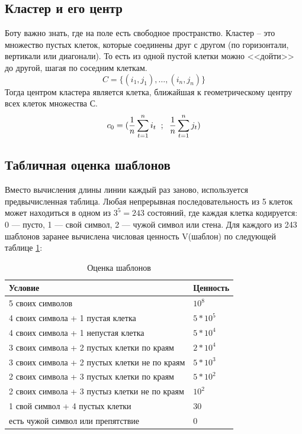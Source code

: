 \documentclass[14pt]{extreport}
\begin{document}
\subsection{Кластер и его центр}
Боту важно знать, где на поле есть свободное пространство.
Кластер -- это множество пустых клеток, которые соединены друг с другом (по горизонтали, вертикали или диагонали). То есть из одной пустой клетки можно <<дойти>> до другой, шагая по соседним клеткам.
\[ C = \{ (i_1, j_1), \dots , (i_n, j_n) \}\]
Тогда центром кластера является клетка, ближайшая к геометрическому центру всех клеток множества С.
\[ c_0 = ( \frac{1}{n} \sum_{t=1}^{n} i_t \hspace{2mm};\hspace{2mm} \frac{1}{n} \sum_{t=1}^{n} j_t) \]

\subsection{Табличная оценка шаблонов}
Вместо вычисления длины линии каждый раз заново, используется предвычисленная таблица. Любая непрерывная последовательность из 5 клеток может находиться в одном из 
$ 3^5=243 $ состояний, где каждая клетка кодируется: \\
0 — пусто,
1 — свой символ,
2 — чужой символ или стена.
Для каждого из 243 шаблонов заранее вычислена числовая ценность V(шаблон) по следующей таблице \ref{tab1}:
\begin{table}[h]
\centering
\renewcommand{\tablename}{\small{Таблица.}}
\caption{\small Оценка шаблонов}
\label{tab1}
\begin{tabular}{|p{8cm}|p{5cm}|}
    \hline
    Условие & Ценность \\
    \hline
    5 своих символов & $10^8$ \\
    \hline
    4 своих символа + 1 пустая клетка & $5*10^5$ \\
    \hline
    4 своих символа + 1 непустая клетка & $5*10^4$ \\
    \hline
    3 своих символа + 2 пустых клетки по краям & $2*10^4$ \\
    \hline
    3 своих символа + 2 пустых клетки не по краям & $5*10^3$ \\
    \hline
    2 своих символа + 3 пустых клетки по краям & $5*10^2$ \\
    \hline
    2 своих символа + 3 пустыз клетки не по краям & $10^2$ \\
    \hline
    1 свой символ + 4 пустых клетки & $30$ \\
    \hline
    есть чужой символ или препятствие & $0$ \\
    \hline
\end{tabular}
\end{table}
\end{document}
